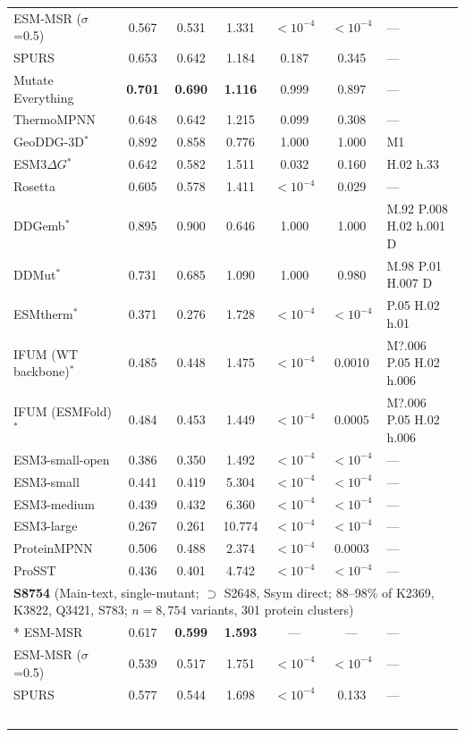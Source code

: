 {\begin{longtable}{lcccccl}
ESM-MSR ($\sigma$=0.5) & 0.567 & 0.531 & 1.331 & $<10^{-4}$ & $<10^{-4}$ & --- \\
SPURS & 0.653 & 0.642 & 1.184 & 0.187 & 0.345 & --- \\
Mutate Everything & \textbf{0.701} & \textbf{0.690} & \textbf{1.116} & 0.999 & 0.897 & --- \\
ThermoMPNN & 0.648 & 0.642 & 1.215 & 0.099 & 0.308 & --- \\
GeoDDG-3D$^*$ & 0.892 & 0.858 & 0.776 & 1.000 & 1.000 & M1 \\
ESM3$\Delta G$$^*$ & 0.642 & 0.582 & 1.511 & 0.032 & 0.160 & H.02 h.33 \\
Rosetta & 0.605 & 0.578 & 1.411 & $<10^{-4}$ & 0.029 & --- \\
DDGemb$^*$ & 0.895 & 0.900 & 0.646 & 1.000 & 1.000 & M.92 P.008 H.02 h.001 D \\
DDMut$^*$ & 0.731 & 0.685 & 1.090 & 1.000 & 0.980 & M.98 P.01 H.007 D \\
ESMtherm$^*$ & 0.371 & 0.276 & 1.728 & $<10^{-4}$ & $<10^{-4}$ & P.05 H.02 h.01 \\
IFUM (WT backbone)$^*$ & 0.485 & 0.448 & 1.475 & $<10^{-4}$ & 0.0010 & M?.006 P.05 H.02 h.006 \\
IFUM (ESMFold)$^*$ & 0.484 & 0.453 & 1.449 & $<10^{-4}$ & 0.0005 & M?.006 P.05 H.02 h.006 \\
ESM3-small-open & 0.386 & 0.350 & 1.492 & $<10^{-4}$ & $<10^{-4}$ & --- \\
ESM3-small & 0.441 & 0.419 & 5.304 & $<10^{-4}$ & $<10^{-4}$ & --- \\
ESM3-medium & 0.439 & 0.432 & 6.360 & $<10^{-4}$ & $<10^{-4}$ & --- \\
ESM3-large & 0.267 & 0.261 & 10.774 & $<10^{-4}$ & $<10^{-4}$ & --- \\
ProteinMPNN & 0.506 & 0.488 & 2.374 & $<10^{-4}$ & 0.0003 & --- \\
ProSST & 0.436 & 0.401 & 4.742 & $<10^{-4}$ & $<10^{-4}$ & --- \\
\midrule
\multicolumn{7}{l}{\textbf{S8754} (Main-text, single-mutant; $\supset$ S2648, Ssym direct; 88--98\% of K2369, K3822, Q3421, S783; $n=8,754$ variants, 301 protein clusters)} \\*
\midrule
ESM-MSR & 0.617 & \textbf{0.599} & \textbf{1.593} & --- & --- & --- \\
ESM-MSR ($\sigma$=0.5) & 0.539 & 0.517 & 1.751 & $<10^{-4}$ & $<10^{-4}$ & --- \\
SPURS & 0.577 & 0.544 & 1.698 & $<10^{-4}$ & 0.133 & --- \\
$$
\end{longtable}}
